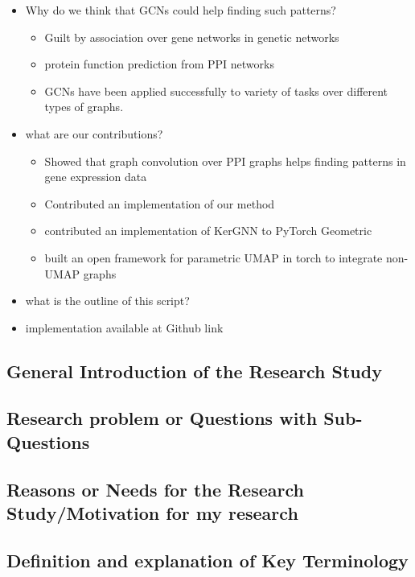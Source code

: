 \documentclass[]{article}
\renewcommand{\cite}{\citep}
\begin{document}
\begin{itemize}
	\item Why do we think that GCNs could help finding such patterns?
	\begin{itemize}
		\item Guilt by association over gene networks \cite{Oliver2000, Gillis2012} in genetic networks
		
		\item protein function prediction from PPI networks \cite{Vazquez2003}
		\item GCNs have been applied successfully to variety of tasks over different types of graphs.		
	\end{itemize}

	\item what are our contributions?
	\begin{itemize}
		\item Showed that graph convolution over PPI graphs helps finding patterns in gene expression data
		\item Contributed an implementation of our method
		\item contributed an implementation of KerGNN to PyTorch Geometric
		\item built an open framework for parametric UMAP in torch to integrate non-UMAP graphs
	\end{itemize}
	\item what is the outline of this script?
	\item implementation available at Github link
\end{itemize}

\subsection*{General Introduction of the Research Study}

\subsection*{Research problem or Questions with Sub-Questions}

\subsection*{Reasons or Needs for the Research Study/Motivation for my research}

\subsection*{Definition and explanation of Key Terminology}
\end{document}
